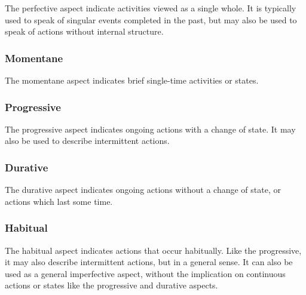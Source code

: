 \documentclass[grammar]{subfiles}
\begin{document}
  The perfective aspect indicate activities viewed as a single whole.
  It is typically used to speak of singular events completed in the past, but
  may also be used to speak of actions without internal structure.


  \subsubsection{Momentane}
  \label{vm:sssec_momentane}

  The momentane aspect indicates brief single-time activities or states.


  \subsubsection{Progressive}
  \label{vm:sssec_progressive}

  The progressive aspect indicates ongoing actions with a change of state.  It
  may also be used to describe intermittent actions.


  \subsubsection{Durative}
  \label{vm:sssec_durative}

  The durative aspect indicates ongoing actions without a change of state, or actions which last some time.


  \subsubsection{Habitual}
  \label{vm:sssec_habitual}

  The habitual aspect indicates actions that occur habitually.  Like the
  progressive, it may also describe intermittent actions, but in a general
  sense.  It can also be used as a general imperfective aspect, without the
  implication on continuous actions or states like the progressive and durative
  aspects. 

\end{document}
